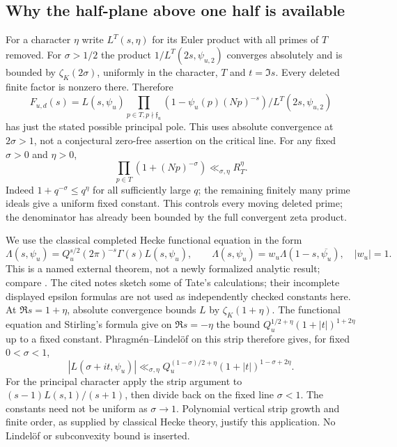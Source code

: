 \documentclass[11pt]{article}
\theoremstyle{definition}\newtheorem{definition}[theorem]{Definition}
\theoremstyle{remark}\newtheorem{remark}[theorem]{Remark}
\begin{document}
\subsection{Why the half-plane above one half is available}
For a character $\eta$ write $L^T(s,\eta)$ for its Euler product with
all primes of $T$ removed. For $\sigma>1/2$ the product
$1/L^T(2s,\psi_{u,2})$ converges absolutely and is bounded by
$\zeta_K(2\sigma)$, uniformly in the character, $T$ and $t=\Im s$.
Every deleted finite factor is nonzero there. Therefore
\[
 F_{u,d}(s)=L(s,\psi_u)
  \prod_{p\in T,p\nmid\mathfrak f_u}(1-\psi_u(p)(Np)^{-s})
  \big/L^T(2s,\psi_{u,2})
\]
has just the stated possible principal pole. This uses absolute convergence
at $2\sigma>1$, not a conjectural zero-free assertion on the critical line.
For any fixed $\sigma>0$ and $\eta>0$,
\[
 \prod_{p\in T}(1+(Np)^{-\sigma})\ll_{\sigma,\eta}R_T^\eta.
\]
Indeed $1+q^{-\sigma}\le q^\eta$ for all sufficiently large $q$;
the remaining finitely many prime ideals give a uniform fixed constant.
This controls every moving deleted prime; the denominator has already
been bounded by the full convergent zeta product.

We use the classical completed Hecke functional equation in the form
\[
 \Lambda(s,\psi_u)=Q_u^{s/2}(2\pi)^{-s}\Gamma(s)L(s,\psi_u),
 \qquad\Lambda(s,\psi_u)=w_u\Lambda(1-s,\overline{\psi_u}),
 \quad |w_u|=1.
\]
This is a named external theorem, not a newly formalized analytic result;
compare \cite[Theorem~4.3, Corollary~4.4]{KudlaTateTypeI}. The cited notes
sketch some of Tate's calculations; their incomplete displayed epsilon
formulas are not used as independently checked constants here.
At $\Re s=1+\eta$, absolute convergence bounds $L$ by $\zeta_K(1+\eta)$.
The functional equation and Stirling's formula give on $\Re s=-\eta$
the bound $Q_u^{1/2+\eta}(1+|t|)^{1+2\eta}$ up to a fixed constant.
Phragm\'en--Lindel\"of on this strip therefore gives, for fixed
$0<\sigma<1$,
\[
 |L(\sigma+it,\psi_u)|
 \ll_{\sigma,\eta}Q_u^{(1-\sigma)/2+\eta}
                      (1+|t|)^{1-\sigma+2\eta}.
\]
For the principal character apply the strip argument to
$(s-1)L(s,1)/(s+1)$, then divide back on the fixed line $\sigma<1$.
The constants need not be uniform as $\sigma\to1$. Polynomial vertical
strip growth and finite order, as supplied by classical Hecke theory,
justify this application. No Lindel\"of or subconvexity bound is inserted.
\end{document}
